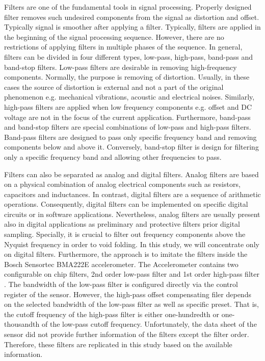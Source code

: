\documentclass[english,12pt,a4paper,pdftex,elec,utf8]{aaltothesis}
\begin{document}
Filters are one of the fundamental tools in signal processing. Properly designed filter removes such undesired components from the signal as distortion and offset. Typically signal is smoother after applying a filter. Typically, filters are applied in the beginning of the signal processing sequence. However, there are no restrictions of applying filters in multiple phases of the sequence. In general, filters can be divided in four different types, low-pass, high-pass, band-pass and band-stop filters. Low-pass filters are desirable in removing high-frequency components. Normally, the purpose is removing of distortion. Usually, in these cases the source of distortion is external and not a part of the original phenomenon e.g. mechanical vibrations, acoustic and electrical noises. Similarly, high-pass filters are applied when low frequency components e.g. offset and DC voltage are not in the focus of the current application. Furthermore, band-pass and band-stop filters are special combinations of low-pass and high-pass filters. Band-pass filters are designed to pass only specific frequency band and removing components below and above it. Conversely, band-stop filter is design for filtering only a specific frequency band and allowing other frequencies to pass. \cite{digitalfilters} \cite{khan2005digital}

Filters can also be separated as analog and digital filters. Analog filters are based on a physical combination of analog electrical components such as resistors, capacitors and inductances. In contrast, digital filters are a sequence of arithmetic operations. Consequently, digital filters can be implemented on specific digital circuits or in software applications. Nevertheless, analog filters are usually present also in digital applications as preliminary and protective filters prior digital sampling. Specially, it is crucial to filter out frequency components above the Nyquist frequency in order to void folding. In this study, we will concentrate only on digital filters. Furthermore, the approach is to imitate the filters inside the Bosch Sensortec BMA222E accelerometer. The Accelerometer contains two configurable on chip filters, 2nd order low-pass filter and 1st order high-pass filter \cite{bma222datasheet}. The bandwidth of the low-pass filter is configured directly via the control register of the sensor. However, the high-pass offset compensating filer depends on the selected bandwidth of the low-pass filter as well as specific preset. That is, the cutoff frequency of the high-pass filter is either one-hundredth or one-thousandth of the low-pass cutoff frequency. Unfortunately, the data sheet of the sensor did not provide further information of the filters except the filter order. Therefore, these filters are replicated in this study based on the available information.
\end{document}
